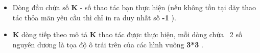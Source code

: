\begin{itemize}
	\item     Dòng đầu chứa số    \textbf{     K    }    - số thao tác bạn thực hiện (nếu không tồn tại dãy thao tác thỏa mãn yêu cầu thì chỉ in ra duy nhất số    \textbf{     -1    }    ).   
	\item \textbf{     K    }    dòng tiếp theo mô tả    \textbf{     K    }    thao tác được thực hiện, mỗi dòng chứa  2 số nguyên dương là tọa độ ô trái trên của các hình vuông    \textbf{     3*3    }    .   
\end{itemize}